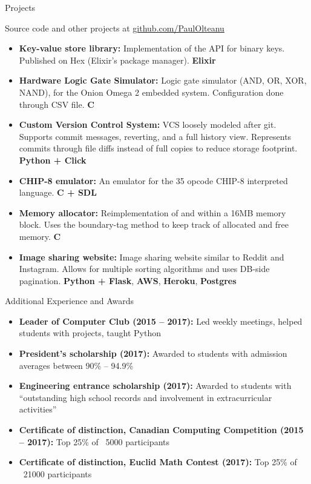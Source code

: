 \documentclass[calibri]{mcdowellcv}
\begin{document}
    \begin{cvsection}{\Large{Projects}}
        \begin{cvsubsection}{}{}{}
            Source code and other projects at \underline{github.com/PaulOlteanu}
            \begin{itemize}
                \item \textbf{Key-value store library:} Implementation of the  API for binary keys. Published on Hex (Elixir's package manager). \textbf{Elixir}
                \item \textbf{Hardware Logic Gate Simulator:} Logic gate simulator (AND, OR, XOR, NAND), for the Onion Omega 2 embedded system. Configuration done through CSV file. \textbf{C}
                \item \textbf{Custom Version Control System:} VCS loosely modeled after git. Supports commit messages, reverting, and a full history view. Represents commits through file diffs instead of full copies to reduce storage footprint. \textbf{Python + Click}
                \item \textbf{CHIP-8 emulator:} An emulator for the 35 opcode CHIP-8 interpreted language. \textbf{C + SDL}
                \item \textbf{Memory allocator:} Reimplementation of  and  within a 16MB memory block. Uses the boundary-tag method to keep track of allocated and free memory. \textbf{C}
                \item \textbf{Image sharing website:} Image sharing website similar to Reddit and Instagram. Allows for multiple sorting algorithms and uses DB-side pagination. \textbf{Python + Flask}, \textbf{AWS}, \textbf{Heroku}, \textbf{Postgres}
            \end{itemize}
        \end{cvsubsection}
    \end{cvsection}

    \begin{cvsection}{\Large{Additional Experience and Awards}}
        \begin{cvsubsection}{}{}{}
            \begin{itemize}
                \item \textbf{Leader of Computer Club (2015 -- 2017):} Led weekly meetings, helped students with projects, taught Python
                \item \textbf{President's scholarship (2017):} Awarded to students with admission averages between 90\% -- 94.9\%
                \item \textbf{Engineering entrance scholarship (2017):} Awarded to students with ``outstanding high school records and involvement in extracurricular activities''
                \item \textbf{Certificate of distinction, Canadian Computing Competition (2015 -- 2017):} Top 25\% of ~5000 participants
                \item \textbf{Certificate of distinction, Euclid Math Contest (2017):} Top 25\% of ~21000 participants
            \end{itemize}
        \end{cvsubsection}
    \end{cvsection}
\end{document}
